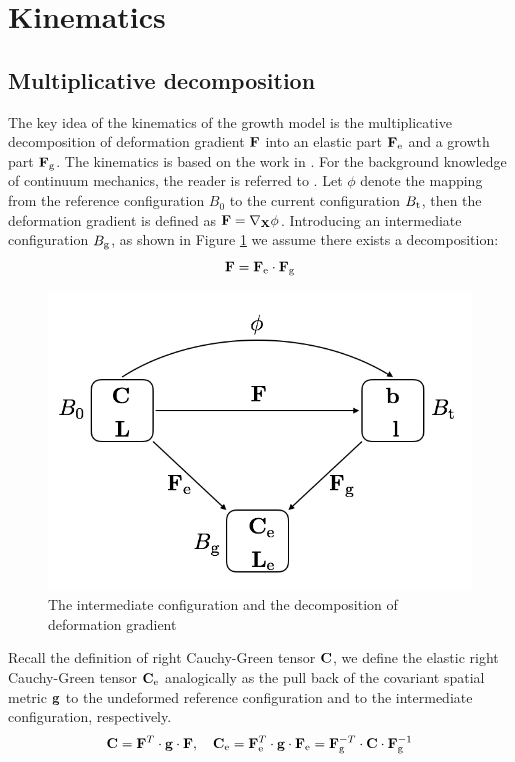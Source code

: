 \section{Kinematics}
\subsection{Multiplicative decomposition}
The key idea of the kinematics of the growth model is the multiplicative decomposition of deformation gradient $\bold{F}$ into an elastic part $\bold{F}_{\mathrm{e}}$ and a growth part $\bold{F}_{\mathrm{g}}$. The kinematics is based on the work in \cite{Himpel, Goktepe2}. For the background knowledge of continuum mechanics, the reader is referred to \cite{Holzapfel}. Let $\phi$ denote the mapping from the reference configuration $B_0$ to the current configuration $B_{\mathrm{t}}$, then the deformation gradient is defined as $\bold{F} = \nabla_{\bold{X}} \phi$. Introducing an intermediate configuration $B_{\mathrm{g}}$, as shown in Figure \ref{fig:decomposition} we assume there exists a decomposition:
\begin{equation} \label{eq:decomposition}
\bold{F} = \bold{F}_{\mathrm{e}} \cdot \bold{F}_{\mathrm{g}}
\end{equation}

\begin{figure}[H]
   \centering
   \includegraphics[width=.5\textwidth]{./figures/decomposition.png} %
   \caption{The intermediate configuration and the decomposition of deformation gradient}
   \label{fig:decomposition}
\end{figure}

Recall the definition of right Cauchy-Green tensor $\bold{C}$, we define the elastic right Cauchy-Green tensor $\bold{C}_{\mathrm{e}}$ analogically as the pull back of the covariant spatial metric $\bold{g}$ to the undeformed reference configuration and to the intermediate configuration, respectively.
\begin{equation} \label{eq:defCe}
\bold{C} = \bold{F}^T \cdot \bold{g} \cdot \bold{F}, \quad \bold{C}_{\mathrm{e}} = \bold{F}_{\mathrm{e}}^T \cdot \bold{g} \cdot \bold{F}_{\mathrm{e}}
=  \bold{F}_{\mathrm{g}}^{-T} \cdot \bold{C} \cdot \bold{F}_{\mathrm{g}}^{-1}
\end{equation}

